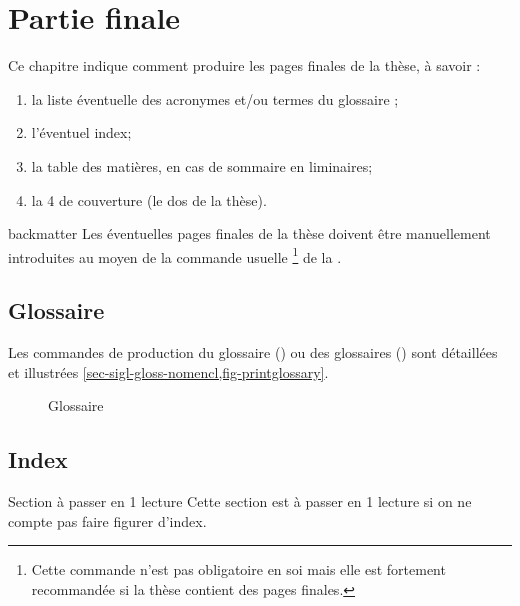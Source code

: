 \chapter{Partie finale}\label{cha-pages-finales}
%

Ce chapitre indique comment produire les pages finales de la thèse,
à savoir :
\begin{enumerate}
\item la liste éventuelle des acronymes et/ou
  termes du glossaire ;
\item l'éventuel index;
\item la table des matières, en cas de sommaire en \glspl{liminaire};
\item la 4\ieme{} de couverture (le dos de la thèse).
\end{enumerate}

\begin{docCommand}{backmatter}{}
  Les éventuelles pages finales de la thèse doivent être manuellement
  introduites au moyen de la commande usuelle
  \footnote{Cette commande n'est pas obligatoire en
    soi mais elle est fortement recommandée si la thèse contient des pages
    finales.} de la \nofrontmatter.
\end{docCommand}

\section{Glossaire}
%

Les commandes de production du glossaire () ou
des glossaires () sont détaillées et illustrées
\vref{sec-sigl-gloss-nomencl,fig-printglossary}.

\begin{figure}[htbp]
  \centering
  \caption{Glossaire}
  \label{fig-printglossary}
\end{figure}

\section{Index}
%

\begin{dbremark*}{Section à passer en 1\iere{} lecture}
  Cette section est à passer en 1\iere{} lecture si on ne compte pas faire
  figurer d'index.
\end{dbremark*}

